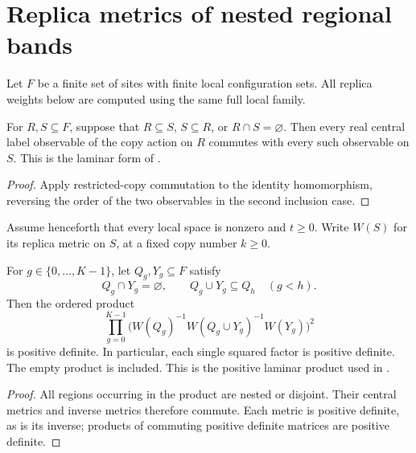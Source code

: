 \section{Replica metrics of nested regional bands}
\label{sec:replica_laminar_band_metrics}

Let $F$ be a finite set of sites with finite local configuration sets.
All replica weights below are computed using the same full local family.

\begin{theorem}
\label{thm:laminar_subsystem_label_commutation}
\leanok
For $R,S\subseteq F$, suppose that $R\subseteq S$, $S\subseteq R$,
or $R\cap S=\varnothing$. Then every real central label observable
of the copy action on $R$ commutes with every such observable on $S$.
This is the laminar form of \cite[Lemma~6.1(2)]{OpenAI2026AreaLaw}.
\end{theorem}
\begin{proof}
\leanok
{}
Apply restricted-copy commutation to the identity homomorphism, reversing
the order of the two observables in the second inclusion case.
\end{proof}

Assume henceforth that every local space is nonzero and $t\ge0$.
Write $W(S)$ for its replica metric on $S$, at a fixed copy number $k\ge0$.

\begin{theorem}
\label{thm:positive_laminar_replica_product}
\leanok
For $g\in\{0,\ldots,K-1\}$, let $Q_g,Y_g\subseteq F$ satisfy
\[
 Q_g\cap Y_g=\varnothing,\qquad Q_g\cup Y_g\subseteq Q_h\quad(g<h).
\]
Then the ordered product
\[
 \prod_{g=0}^{K-1}
 \bigl(W(Q_g)^{-1}W(Q_g\cup Y_g)^{-1}W(Y_g)\bigr)^2
\]
is positive definite. In particular, each single squared factor is positive
definite. The empty product is included. This is the positive laminar
product used in \cite[Section~8, lines~367--378]{OpenAI2026AreaLaw}.
\end{theorem}
\begin{proof}
\leanok
{}
All regions occurring in the product are nested or disjoint. Their central
metrics and inverse metrics therefore commute. Each metric is positive
definite, as is its inverse; products of commuting positive definite
matrices are positive definite.
\end{proof}

